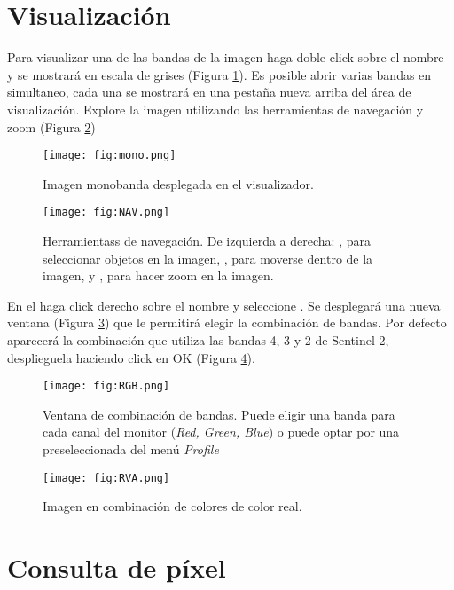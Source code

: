 \section{Visualización}

Para visualizar una de las bandas de la imagen haga doble click sobre el nombre y se mostrará en escala de grises (Figura \ref{fig:mono}). Es posible abrir varias bandas en simultaneo, cada una se mostrará en una pestaña nueva arriba del área de visualización. Explore la imagen utilizando las herramientas de navegación y zoom (Figura \ref{fig:NAV})

\begin{figure}[h!]
    \centering
    \texttt{[image: fig:mono.png]}
    \caption{Imagen monobanda desplegada en el visualizador.}
    \label{fig:mono}
\end{figure}



\begin{figure}[h!]
    \centering
    \texttt{[image: fig:NAV.png]}
    \caption{Herramientass de navegación. De izquierda a derecha: , para seleccionar objetos en la imagen, , para moverse dentro de la imagen, y , para hacer zoom en la imagen.}
    \label{fig:NAV}
\end{figure}

En el  haga click derecho sobre el nombre y seleccione . Se desplegará una nueva ventana (Figura \ref{fig:RGB}) que le permitirá elegir la combinación de bandas. Por defecto aparecerá la combinación que utiliza las bandas 4, 3 y 2 de Sentinel 2, desplieguela haciendo click en OK (Figura \ref{fig:RVA}).

\begin{figure}[h!]
    \centering
    \texttt{[image: fig:RGB.png]}
    \caption{Ventana de combinación de bandas. Puede eligir una banda para cada canal del monitor (\emph{Red, Green, Blue}) o puede optar por una preseleccionada del menú \emph{Profile}}
    \label{fig:RGB}
\end{figure}



\begin{figure}[h!]
    \centering
    \texttt{[image: fig:RVA.png]}
    \caption{Imagen en combinación de colores de color real.}
    \label{fig:RVA}
\end{figure}


\section{Consulta de píxel}

